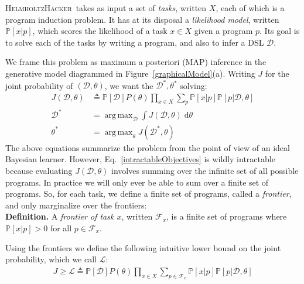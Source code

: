 \documentclass{article}
\newcommand{\system}{\textsc{HelmholtzHacker}~}
\newcommand{\lowerBound}{\mathscr{L}}
\DeclareMathOperator*{\argmax}{arg\,max} %
\newcommand{\probability}{\mathds{P}} %
\begin{document}
\system takes as input a set of \emph{tasks}, written $X$, each of which is a program induction problem.
It has at its disposal a \emph{likelihood model}, written $\probability[x|p]$, which scores the likelihood of a task $x\in X$ given a program $p$.
Its goal is to solve each of the tasks by writing a program,
and also to infer a DSL $\mathcal{D}$.

We frame this problem as maximum a posteriori (MAP) inference in the generative model diagrammed in Figure~\ref{graphicalModel}(a). Writing $J$ for the joint probability of $(\mathcal{D},\theta)$, we want the $\mathcal{D}^*,\theta^*$ solving:
\begin{align}\label{intractableObjectives}
\nonumber  J(\mathcal{D},\theta)&\triangleq \probability[\mathcal{D}]P(\theta)\prod_{x\in X} \sum_p \probability[x|p]\probability[p|\mathcal{D},\theta]\\
  \mathcal{D}^* &= \argmax_{\mathcal{D}}\int J(\mathcal{D},\theta)\;\mathrm{d}\theta \\
\nonumber  \theta^*& =\argmax_\theta J(\mathcal{D}^*,\theta)
\end{align}
The above equations summarize the problem from the point of view of an ideal Bayesian learner.
However, Eq.~\ref{intractableObjectives}
is wildly intractable because evaluating $J(\mathcal{D},\theta)$ involves
summing over the  infinite set of all possible programs.
In practice we will only ever be able to sum over a finite set of programs.
So, for each task, we define a finite set of programs, called a \emph{frontier}, and only marginalize over the frontiers:
\\\noindent\textbf{Definition.} A \emph{frontier of task $x$}, written $\mathcal{F}_x$,
is a finite set of programs where $\probability[x|p] > 0$ for all $p\in \mathcal{F}_x$.

Using the frontiers we  define the following intuitive lower bound on the joint probability, which we call $\lowerBound$:
\begin{align}
 J\geq \lowerBound\triangleq\probability[\mathcal{D}]P(\theta)\prod_{x\in X} \sum_{p\in \mathcal{F}_x} \probability[x|p]\probability[p|\mathcal{D},\theta]
\end{align}

\end{document}
